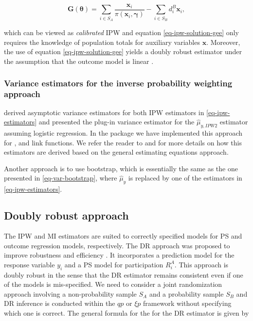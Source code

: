 \documentclass[
]{jss}
\begin{document}
\begin{equation}
\boldsymbol{G}(\boldsymbol{\theta}) = \sum_{i \in S_A} \frac{\boldsymbol{x}_i}{\pi\left(\boldsymbol{x}_i, \boldsymbol{\gamma}\right) }-\sum_{i \in S_B} d_i^B \boldsymbol{x}_i,
\label{eq-ipw-solution-gee}
\end{equation}

which can be viewed as \textit{calibrated} IPW and equation
\eqref{eq-ipw-solution-gee} only requires the knowledge of population
totals for auxiliary variables \(\boldsymbol{x}\). Moreover, the use of
equation \eqref{eq-ipw-solution-gee} yields a doubly robust estimator
under the assumption that the outcome model is linear
\citep{kim_theory_2012}.

\subsubsection{Variance estimators for the inverse probability weighting
approach}\label{variance-estimators-for-the-inverse-probability-weighting-approach}

\citet[section 3.2]{chen2020doubly} derived asymptotic variance
estimators for both IPW estimators in \eqref{eq-ipw-estimators} and
presented the plug-in variance estimator for the \(\hat{\mu}_{y,IPW2}\)
estimator assuming logistic regression. In the package we have
implemented this approach for ,  and
 link functions. We refer the reader to
\citet[section 6.2]{wu2022statistical} and
\citet[chapter 3]{chrostowski2024statistical} for more details on how
this estimators are derived based on the general estimating equations
approach.

Another approach is to use bootstrap, which is essentially the same as
the one presented in \eqref{eq-var-bootstrap}, where \(\hat{\mu}_y\) is
replaced by one of the estimators in \eqref{eq-ipw-estimators}.

\subsection{Doubly robust approach}\label{sec-dr-approach}

The IPW and MI estimators are suited to correctly specified models for
PS and outcome regression models, respectively. The DR approach was
proposed to improve robustness and efficiency
\citep[cf.][]{robins1994estimation}. It incorporates a prediction model
for the response variable \(y_i\) and a PS model for participation
\(R_i^A\). This approach is doubly robust in the sense that the DR
estimator remains consistent even if one of the models is mis-specified.
We need to consider a joint randomization approach involving a
non-probability sample \(S_A\) and a probability sample \(S_B\) and DR
inference is conducted within the \(qp\) or \(\xi p\) framework without
specifying which one is correct. The general formula for the for the DR
estimator is given by
\end{document}
